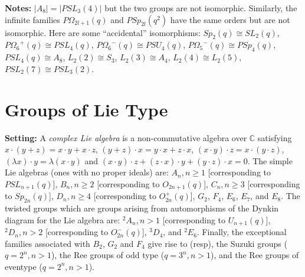 {\bf Notes:} $|A_8|=|PSL_3(4)|$ but the two groups are not isomorphic.  Similarly, the infinite
families $P \Omega_{2l+1}(q)$ and $PSp_{2l}(q^2)$ have the same orders but are not isomorphic.
Here are some ``accidental'' isomorphisms:
$Sp_2(q) \cong SL_2(q)$,
$P{\Omega_6}^+(q) \cong PSL_4(q)$,
$P{\Omega_6}^-(q) \cong PSU_4(q)$,
$P{\Omega_5}^-(q) \cong PSp_4(q)$,
$PSL_4(q) \cong A_8$,
$L_2(2) \cong S_3$,
$L_2(3) \cong A_4$,
$L_2(4) \cong L_2(5)$,
$PSL_2(7) \cong PSL_3(2)$.
\section{Groups of Lie Type}
{\bf Setting:}
A \emph{complex Lie algebra} is a non-commutative algebra over ${\mathbb C}$ satisfying
$x \cdot (y+z)= x \cdot y + x \cdot z$,
$(y+z) \cdot x =  y \cdot x + z \cdot x$, $(x \cdot y) \cdot z = x \cdot (y \cdot z)$,
$(\lambda x) \cdot y = \lambda (x \cdot y)$ and
$ (x \cdot y) \cdot z + (z \cdot x) \cdot y + (y \cdot z) \cdot x = 0$.
The simple Lie algebras (ones with no proper ideals) are:
$A_n, n \ge 1$ [corresponding to $PSL_{n+1}(q)$],
$B_n, n \ge 2$ [corresponding to $O_{2n+1}(q)$],
$C_n, n \ge 3$ [corresponding to $Sp_{2n}(q)$],
$D_n, n \ge 4$ [corresponding to $O^+_{2n}(q)$],
$G_2$,
$F_4$,
$E_6$,
$E_7$, and
$E_8$.  The twisted groups which are groups arising from automorphisms of the Dynkin
diagram for the Lie algebra are:
$^2A_n, n > 1$ [corresponding to $U_{n+1}(q)$],
$^2D_n, n > 2$ [corresponding to $O^-_{2n}(q)$],
$^3D_4$, and $^2E_6$.  Finally, the exceptional families associated with
$B_2$, $G_2$ and $F_4$ give rise to (resp), 
the Suzuki groups ($q=2^n, n > 1$),
the Ree groups of odd type ($q=3^n, n > 1$), and
the Ree groups of eventype ($q=2^n, n > 1$).
